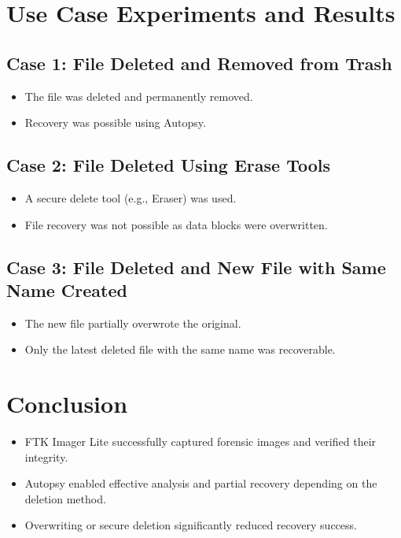 \documentclass[11pt]{article}
\begin{document}
\section{Use Case Experiments and Results}

\subsection{Case 1: File Deleted and Removed from Trash}
\begin{itemize}
    \item The file was deleted and permanently removed.
    \item Recovery was possible using Autopsy.
\end{itemize}


\subsection{Case 2: File Deleted Using Erase Tools}
\begin{itemize}
    \item A secure delete tool (e.g., Eraser) was used.
    \item File recovery was not possible as data blocks were overwritten.
\end{itemize}


\subsection{Case 3: File Deleted and New File with Same Name Created}
\begin{itemize}
    \item The new file partially overwrote the original.
    \item Only the latest deleted file with the same name was recoverable.
\end{itemize}

\section{Conclusion}
\begin{itemize}
    \item FTK Imager Lite successfully captured forensic images and verified their integrity.
    \item Autopsy enabled effective analysis and partial recovery depending on the deletion method.
    \item Overwriting or secure deletion significantly reduced recovery success.
\end{itemize}
\end{document}
